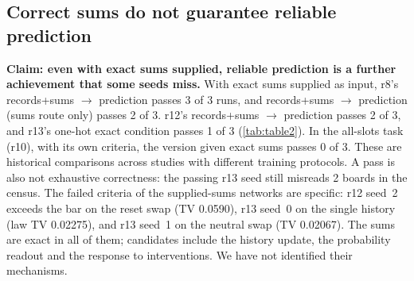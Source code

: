 \subsection{Correct sums do not guarantee reliable prediction}\label{sec:res-reliable}

\textbf{Claim: even with exact sums supplied, reliable prediction is a
further achievement that some seeds miss.} With exact sums supplied as
input, r8's records+sums $\to$ prediction passes 3 of 3 runs, and records+sums $\to$ prediction (sums route only) passes 2 of 3. r12's records+sums $\to$
prediction passes 2 of 3, and r13's one-hot exact condition passes 1 of 3
(\cref{tab:table2}). In the all-slots task (r10), with its own criteria, the
version given exact sums passes 0 of 3. These are historical
comparisons across studies with different training protocols. A pass is also
not exhaustive correctness: the passing r13 seed still misreads 2 boards in
the census. The failed criteria of the supplied-sums networks are specific: r12 seed~2
exceeds the bar on the reset swap (TV 0.0590), r13 seed~0 on the single
\Lcat{} history (law TV 0.02275), and r13 seed~1 on the neutral swap (TV
0.02067). The sums are exact in all of them; candidates include the history update, the probability readout and the
response to interventions. We have not identified their mechanisms.
